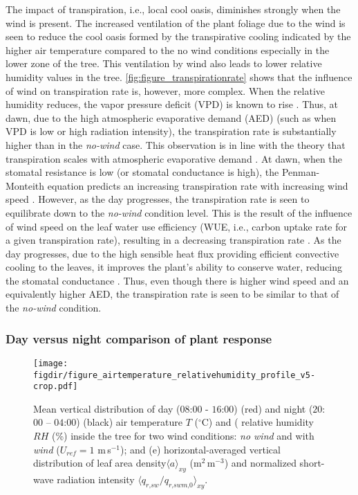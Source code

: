 The impact of transpiration, i.e., local cool oasis, diminishes strongly when the wind is present. The increased ventilation of the plant foliage due to the wind is seen to reduce the cool oasis formed by the transpirative cooling indicated by the higher air temperature compared to the no wind conditions especially in the lower zone of the tree. This ventilation by wind also leads to lower relative humidity values in the tree. \cref{fig:figure_transpirationrate} shows that the influence of wind on transpiration rate is, however, more complex. When the relative humidity reduces, the vapor pressure deficit (VPD) is known to rise \citep{Manickathan2018a}. Thus, at dawn, due to the high atmospheric evaporative demand (AED) (such as when VPD is low or high radiation intensity), the transpiration rate is substantially higher than in the \textit{no-wind} case. This observation is in line with the theory that transpiration scales with atmospheric evaporative demand \citep{McVicar2012}. At dawn, when the stomatal resistance is low (or stomatal conductance is high), the Penman-Monteith equation predicts an increasing transpiration rate with increasing wind speed \citep{Idso1977,nobel2009physicochemical}. However, as the day progresses, the transpiration rate is seen to equilibrate down to the \textit{no-wind} condition level. This is the result of the influence of wind speed on the leaf water use efficiency (WUE, i.e., carbon uptake rate for a given transpiration rate), resulting in a decreasing transpiration rate \citep{Dixon1983,nobel2009physicochemical,Schymanski2016}. As the day progresses, due to the high sensible heat flux providing efficient convective cooling to the leaves, it improves the plant’s ability to conserve water, reducing the stomatal conductance \citep{Idso1977}. Thus, even though there is higher wind speed and an equivalently higher AED, the transpiration rate is seen to be similar to that of the \textit{no-wind} condition.


\subsubsection*{Day versus night comparison of plant response}


\begin{sidewaysfigure}[p]
	\centering
	\texttt{[image: \\figdir/figure\_airtemperature\_relativehumidity\_profile\_v5-crop.pdf]}
	\caption{Mean vertical distribution of day ($08$:$00$ - $16$:$00$) (red) and night ($20$:$00$ – $04$:$00$)  (black)  air temperature $T$ ($^{\circ}$C) and ( relative humidity $RH$ (\%) inside the tree for two wind conditions:   \textit{no wind} and  with \textit{wind} ($U_{ref}=1$ m\,s$^{-1}$); and (e) horizontal-averaged vertical distribution of leaf area density$\langle a \rangle_{\textit{xy}}$ (m$^2$\,m$^{-3}$) and normalized short-wave radiation intensity  $\langle q_{\textit{r,sw}}/q_{\textit{r,swm,0}} \rangle_{\textit{xy}}$.}
	\label{fig:figure_airtemperature_relativehumidity_profile}
\end{sidewaysfigure}

